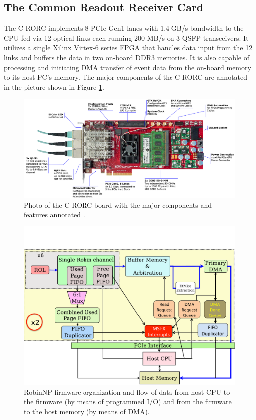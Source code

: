 \documentclass{JINST}
\begin{document}
\subsection{The Common Readout Receiver Card}\label{sec:crorc}

The C-RORC implements 8 PCIe Gen1 lanes with 1.4 GB/s bandwidth to the CPU fed via 12 optical links each running 200 MB/s on 3 QSFP transceivers. It utilizes a single Xilinx Virtex-6 series FPGA that handles data input from the 12 links and buffers the data in two on-board DDR3 memories. It is also capable of processing and initiating DMA transfer of event data from the on-board memory to its host PC's memory. The major components of the C-RORC are annotated 
in the picture shown in Figure \ref{fig:crorc}.


\begin{figure}[tbp] %
\centering
\includegraphics[width=\textwidth]{figures/crorc.png}
\caption{Photo of the C-RORC board with the major components and features annotated \cite{crorc}.}
\label{fig:crorc}
\end{figure}

\begin{figure}[tbp] %
\centering
\includegraphics[trim = 0cm 0cm 0cm 2.5cm, clip, width=.71\textwidth]{figures/RobinNP_Firmware}

\caption{RobinNP firmware organization
and  flow  of  data  from  host  CPU  to  the
firmware  (by  means  of  programmed  I/O)
and from the firmware to the host memory
(by means of DMA).}
\label{fig:robinnp_fw}
\end{figure}
\end{document}
